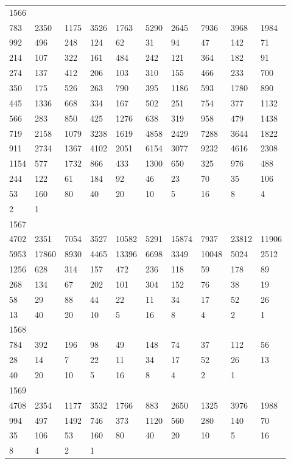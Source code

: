 \begin{longtable}{*{10}{l}}
1566&&&&&&&&&\\
783& 2350& 1175& 3526& 1763& 5290& 2645& 7936& 3968& 1984\\
992& 496& 248& 124& 62& 31& 94& 47& 142& 71\\
214& 107& 322& 161& 484& 242& 121& 364& 182& 91\\
274& 137& 412& 206& 103& 310& 155& 466& 233& 700\\
350& 175& 526& 263& 790& 395& 1186& 593& 1780& 890\\
445& 1336& 668& 334& 167& 502& 251& 754& 377& 1132\\
566& 283& 850& 425& 1276& 638& 319& 958& 479& 1438\\
719& 2158& 1079& 3238& 1619& 4858& 2429& 7288& 3644& 1822\\
911& 2734& 1367& 4102& 2051& 6154& 3077& 9232& 4616& 2308\\
1154& 577& 1732& 866& 433& 1300& 650& 325& 976& 488\\
244& 122& 61& 184& 92& 46& 23& 70& 35& 106\\
53& 160& 80& 40& 20& 10& 5& 16& 8& 4\\
2& 1& \\

1567&&&&&&&&&\\
4702& 2351& 7054& 3527& 10582& 5291& 15874& 7937& 23812& 11906\\
5953& 17860& 8930& 4465& 13396& 6698& 3349& 10048& 5024& 2512\\
1256& 628& 314& 157& 472& 236& 118& 59& 178& 89\\
268& 134& 67& 202& 101& 304& 152& 76& 38& 19\\
58& 29& 88& 44& 22& 11& 34& 17& 52& 26\\
13& 40& 20& 10& 5& 16& 8& 4& 2& 1\\

1568&&&&&&&&&\\
784& 392& 196& 98& 49& 148& 74& 37& 112& 56\\
28& 14& 7& 22& 11& 34& 17& 52& 26& 13\\
40& 20& 10& 5& 16& 8& 4& 2& 1& \\

1569&&&&&&&&&\\
4708& 2354& 1177& 3532& 1766& 883& 2650& 1325& 3976& 1988\\
994& 497& 1492& 746& 373& 1120& 560& 280& 140& 70\\
35& 106& 53& 160& 80& 40& 20& 10& 5& 16\\
8& 4& 2& 1& \\


\end{longtable}
